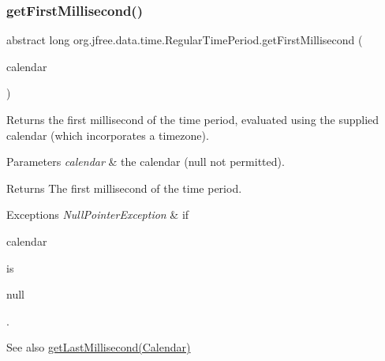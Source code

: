 \subsubsection{\texorpdfstring{get\+First\+Millisecond()}{getFirstMillisecond()}\hspace{0.1cm}{\footnotesize\ttfamily [3/3]}}
{\footnotesize\ttfamily abstract long org.\+jfree.\+data.\+time.\+Regular\+Time\+Period.\+get\+First\+Millisecond (\begin{DoxyParamCaption}\item[{Calendar}]{calendar }\end{DoxyParamCaption})\hspace{0.3cm}{\ttfamily [abstract]}}

Returns the first millisecond of the time period, evaluated using the supplied calendar (which incorporates a timezone).


\begin{DoxyParams}{Parameters}
{\em calendar} & the calendar ({\ttfamily null} not permitted).\\
\hline
\end{DoxyParams}
\begin{DoxyReturn}{Returns}
The first millisecond of the time period.
\end{DoxyReturn}

\begin{DoxyExceptions}{Exceptions}
{\em Null\+Pointer\+Exception} & if
\begin{DoxyCode}
calendar 
\end{DoxyCode}
 is
\begin{DoxyCode}
null 
\end{DoxyCode}
 .\\
\hline
\end{DoxyExceptions}
\begin{DoxySeeAlso}{See also}
\mbox{\hyperlink{classorg_1_1jfree_1_1data_1_1time_1_1_regular_time_period_a5e5b6c8eec369a8e1461021b3fa602ce}{get\+Last\+Millisecond(\+Calendar)}} 
\end{DoxySeeAlso}
\mbox{\label{classorg_1_1jfree_1_1data_1_1time_1_1_regular_time_period_ab5ad818ae1c90ec6efd57304594e6801}} 
